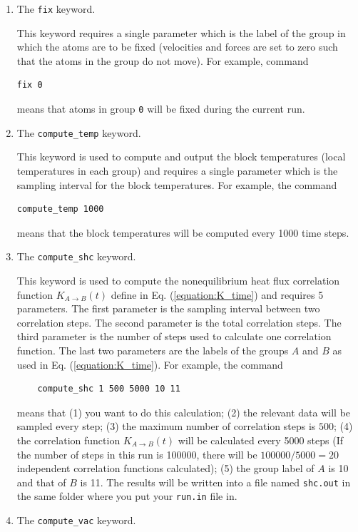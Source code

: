 \documentclass[12pt,a4paper]{report}
\begin{document}
\begin{enumerate}
\item The \verb"fix" keyword.

This keyword requires a single parameter which is the label of the group in which the atoms are to be fixed (velocities and forces are set to zero such that the atoms in the group do not move). For example, command
\begin{verbatim}
fix 0
\end{verbatim}
means that atoms in group \verb"0" will be fixed during the current run.



\item The \verb"compute_temp" keyword.

This keyword is used to compute and output the block temperatures (local temperatures in each group) and requires a single parameter which is the sampling interval for the block temperatures. For example, the command
\begin{verbatim}
compute_temp 1000
\end{verbatim}
means that the block temperatures will be computed every 1000 time steps.


\item The \verb"compute_shc" keyword.

This keyword is used to compute the nonequilibrium heat flux correlation function $K_{A \rightarrow B}(t)$ define in Eq. (\ref{equation:K_time}) and requires 5 parameters. The first parameter is the sampling interval between two correlation steps. The second parameter is the total correlation steps. The third parameter is the number of steps used to calculate one correlation function. The last two parameters are the labels of the groups $A$ and $B$ as used in Eq. (\ref{equation:K_time}). For example, the command
\begin{verbatim}
    compute_shc 1 500 5000 10 11
\end{verbatim}
means that (1) you want to do this calculation; (2) the relevant data will be sampled every step; (3) the maximum number of correlation steps is $500$; (4) the correlation function $K_{A \rightarrow B}(t)$ will be calculated every 5000 steps (If the number of steps in this run is 100000, there will be $100000/5000=20$ independent correlation functions calculated); (5) the group label of $A$ is 10 and that of $B$ is 11. The results will be written into a file named \verb"shc.out" in the same folder where you put your \verb"run.in" file in.


\item The \verb"compute_vac" keyword.


\end{enumerate}
\end{document}
